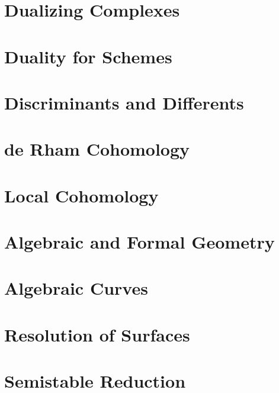 \chapter{Dualizing Complexes}
\label{chap:dualizing}


\chapter{Duality for Schemes}
\label{chap:duality}


\chapter{Discriminants and Differents}
\label{chap:discriminant}


\chapter{de Rham Cohomology}
\label{chap:derham}


\chapter{Local Cohomology}
\label{chap:local-cohomology}


\chapter{Algebraic and Formal Geometry}
\label{chap:algebraization}


\chapter{Algebraic Curves}
\label{chap:curves}


\chapter{Resolution of Surfaces}
\label{chap:resolve}


\chapter{Semistable Reduction}
\label{chap:models}


